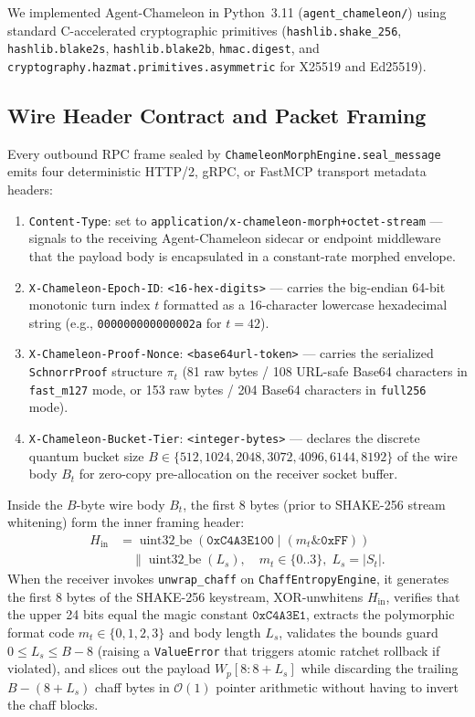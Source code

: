 \documentclass[conference,10pt]{IEEEtran}
\begin{document}
We implemented Agent-Chameleon in Python~3.11 (\texttt{agent\_chameleon/}) using standard C-accelerated cryptographic primitives (\texttt{hashlib.shake\_256}, \texttt{hashlib.blake2s}, \texttt{hashlib.blake2b}, \texttt{hmac.digest}, and \texttt{cryptography.hazmat.primitives.asymmetric} for X25519 and Ed25519).

\subsection{Wire Header Contract and Packet Framing}
Every outbound RPC frame sealed by \texttt{ChameleonMorphEngine.seal\_message} emits four deterministic HTTP/2, gRPC, or FastMCP transport metadata headers:
\begin{enumerate}
    \item \texttt{Content-Type}: set to \texttt{application/}\allowbreak\texttt{x-chameleon-morph+}\allowbreak\texttt{octet-stream} --- signals to the receiving Agent-Chameleon sidecar or endpoint middleware that the payload body is encapsulated in a constant-rate morphed envelope.
    \item \texttt{X-Chameleon-Epoch-ID}: \texttt{<16-hex-digits>} --- carries the big-endian 64-bit monotonic turn index $t$ formatted as a 16-character lowercase hexadecimal string (e.g., \texttt{000000000000002a} for $t = 42$).
    \item \texttt{X-Chameleon-Proof-Nonce}: \texttt{<base64url-token>} --- carries the serialized \texttt{SchnorrProof} structure $\pi_t$ (81 raw bytes / 108 URL-safe Base64 characters in \texttt{fast\_m127} mode, or 153 raw bytes / 204 Base64 characters in \texttt{full256} mode).
    \item \texttt{X-Chameleon-Bucket-Tier}: \texttt{<integer-bytes>} --- declares the discrete quantum bucket size $B \in \{512, 1024, 2048, 3072, 4096, 6144, 8192\}$ of the wire body $B_t$ for zero-copy pre-allocation on the receiver socket buffer.
\end{enumerate}

Inside the $B$-byte wire body $B_t$, the first 8 bytes (prior to SHAKE-256 stream whitening) form the inner framing header:
\begin{equation}
\label{eq:inner_hdr}
\begin{aligned}
H_{\text{in}} &= \operatorname{uint32\_be}\left(\mathtt{0xC4A3E100} \mid (m_t \mathbin{\&} \mathtt{0xFF})\right) \\
&\quad \parallel \operatorname{uint32\_be}(L_s), \quad m_t \in \{0..3\},\; L_s = |S_t|.
\end{aligned}
\end{equation}
When the receiver invokes \texttt{unwrap\_chaff} on \texttt{ChaffEntropyEngine}, it generates the first 8 bytes of the SHAKE-256 keystream, XOR-unwhitens $H_{\text{in}}$, verifies that the upper 24 bits equal the magic constant $\mathtt{0xC4A3E1}$, extracts the polymorphic format code $m_t \in \{0,1,2,3\}$ and body length $L_s$, validates the bounds guard $0 \le L_s \le B - 8$ (raising a \texttt{ValueError} that triggers atomic ratchet rollback if violated), and slices out the payload $W_p[8 : 8 + L_s]$ while discarding the trailing $B - (8 + L_s)$ chaff bytes in $\mathcal{O}(1)$ pointer arithmetic without having to invert the chaff blocks.
\end{document}
